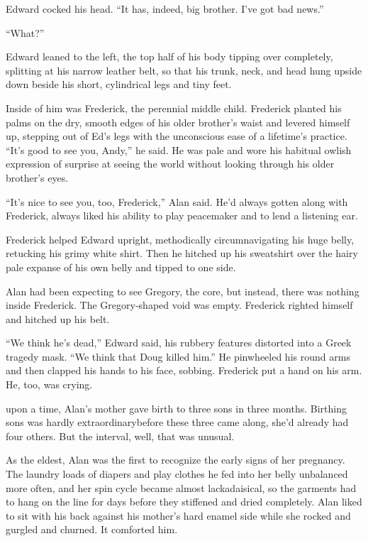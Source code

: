 Edward cocked his head.  ``It has, indeed, big brother.  I've got bad
news.''

``What?''

Edward leaned to the left, the top half of his body tipping over
completely, splitting at his narrow leather belt, so that his trunk,
neck, and head hung upside down beside his short, cylindrical legs and
tiny feet.

Inside of him was Frederick, the perennial middle child.  Frederick
planted his palms on the dry, smooth edges of his older brother's
waist and levered himself up, stepping out of Ed's legs with the
unconscious ease of a lifetime's practice.  ``It's good to see you,
Andy,'' he said.  He was pale and wore his habitual owlish expression
of surprise at seeing the world without looking through his older
brother's eyes.

``It's nice to see you, too, Frederick,'' Alan said.  He'd always
gotten along with Frederick, always liked his ability to play
peacemaker and to lend a listening ear.

Frederick helped Edward upright, methodically circumnavigating his
huge belly, retucking his grimy white shirt.  Then he hitched up his
sweatshirt over the hairy pale expanse of his own belly and tipped to
one side.

Alan had been expecting to see Gregory, the core, but instead, there
was nothing inside Frederick.  The Gregory-shaped void was empty. 
Frederick righted himself and hitched up his belt.

``We think he's dead,'' Edward said, his rubbery features distorted
into a Greek tragedy mask.  ``We think that Doug killed him.'' He
pinwheeled his round arms and then clapped his hands to his face,
sobbing.  Frederick put a hand on his arm.  He, too, was crying.

 upon a time, Alan's mother gave birth to three sons in three
months.  Birthing sons was hardly extraordinary\dash{}before these three
came along, she'd already had four others.  But the interval, well,
that was unusual.

As the eldest, Alan was the first to recognize the early signs of her
pregnancy.  The laundry loads of diapers and play clothes he fed into
her belly unbalanced more often, and her spin cycle became almost
lackadaisical, so the garments had to hang on the line for days before
they stiffened and dried completely.  Alan liked to sit with his back
against his mother's hard enamel side while she rocked and gurgled and
churned.  It comforted him.

